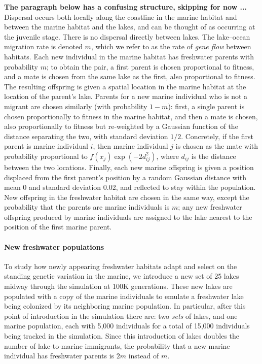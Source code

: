\documentclass{article}
\begin{document}
\textbf{The paragraph below has a confusing structure, skipping for now ... }
Dispersal occurs both locally along the coastline in the marine habitat 
and between the marine habitat and the lakes, and can be thought of as occurring at the juvenile stage. 
There is no dispersal directly between lakes.
The lake--ocean migration rate is denoted $m$, 
which we refer to as the rate of \emph{gene flow} between habitats.
Each new individual in the marine habitat has freshwater parents with probability $m$; 
to obtain the pair, a first parent is chosen proportional to fitness, and a mate is chosen from the same lake as the first, also proportional to fitness. 
The resulting offspring is given a spatial location in the marine habitat at the location of the parent's lake. 
Parents for a new marine individual who is not a migrant are chosen similarly (with probability $1-m$): 
first, a single parent is chosen proportionally to fitness in the marine habitat,
and then a mate is chosen, also proportionally to fitness but re-weighted by a Gaussian function of the distance separating the two, with standard deviation $1/2$. 
Concretely, if the first parent is marine individual $i$, then marine individual $j$ is chosen as the mate with probability proportional to $f(x_j) \exp(-2d_{ij}^2)$,
where $d_{ij}$ is the distance between the two locations. 
Finally, each new marine offspring is given a position displaced from the first parent's position by a random Gaussian distance with mean 0 and standard deviation 0.02, 
and reflected to stay within the population.
New offspring in the freshwater habitat are chosen in the same way, except the probability that the parents are marine individuals is $m$; 
any new freshwater offspring produced by marine individuals are assigned to the lake nearest to the position of the first marine parent.

\paragraph{New freshwater populations} 
To study how newly appearing freshwater habitats adapt and select on the standing genetic variation in the marine, we introduce a new set of 25 lakes midway through the simulation at 100K generations.
These new lakes are populated with a copy of the marine individuals to emulate a freshwater lake being colonized by its neighboring marine population. 
In particular, after this point of introduction in the simulation there are:
two \emph{sets} of lakes, and one marine population, each with 5,000 individuals for a total of 15,000 individuals being tracked in the simulation. 
Since this introduction of lakes doubles the number of lake-to-marine immigrants, 
the probability that a new marine individual has freshwater parents is $2m$ instead of $m$.
\end{document}
